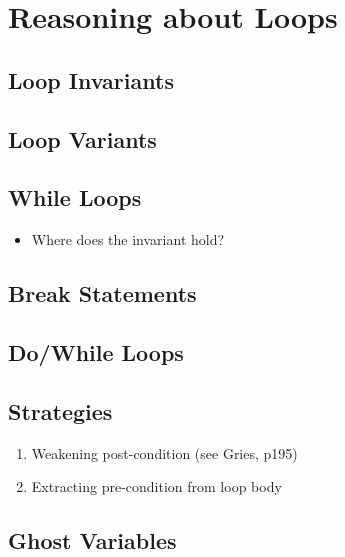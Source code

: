 \chapter{Reasoning about Loops}

\section{Loop Invariants}
\section{Loop Variants}
\section{While Loops}
\begin{itemize}
\item Where does the invariant hold?
\end{itemize}
\section{Break Statements}
\section{Do/While Loops}
\section{Strategies}
\begin{enumerate}
\item Weakening post-condition (see Gries, p195)
\item Extracting pre-condition from loop body
\end{enumerate}
\section{Ghost Variables}